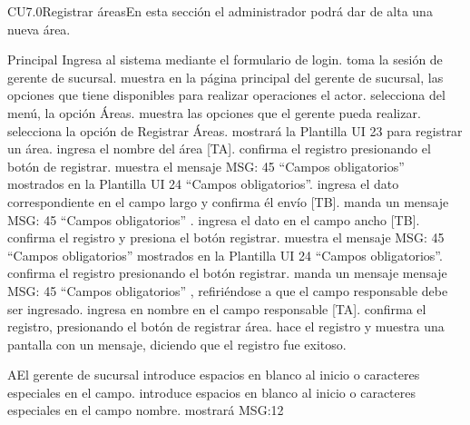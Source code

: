 
	\begin{UseCase}{CU7.0}{Registrar áreas}{En esta sección el administrador podrá dar de alta una nueva área.}
	\end{UseCase}


	\begin{UCtrayectoria}{Principal}
		\UCpaso[\UCactor] Ingresa al sistema mediante el formulario de login.
		\UCpaso toma la sesión de gerente de sucursal.
		\UCpaso muestra en la página principal del gerente de sucursal, las opciones que tiene disponibles para realizar operaciones el actor. 
		\UCpaso[\UCactor] selecciona del menú, la opción Áreas.
		\UCpaso muestra las opciones que el gerente pueda realizar.
		\UCpaso[\UCactor] selecciona la opción de Registrar Áreas.
		\UCpaso mostrará la Plantilla UI 23 para registrar un área.
		\UCpaso[\UCactor] ingresa el nombre del área [TA].
		\UCpaso[\UCactor] confirma el registro presionando el botón de registrar.
		\UCpaso muestra el mensaje MSG: 45 “Campos obligatorios”  mostrados en la Plantilla UI 24 “Campos obligatorios”.
		\UCpaso[\UCactor] ingresa el dato correspondiente en el campo largo y confirma él envío [TB].
		\UCpaso manda un mensaje MSG: 45 “Campos obligatorios” .
		\UCpaso[\UCactor] ingresa el dato en el campo ancho [TB].
		\UCpaso[\UCactor] confirma el registro y presiona el botón registrar.
		\UCpaso muestra el mensaje MSG: 45 “Campos obligatorios”  mostrados en la Plantilla UI 24 “Campos obligatorios”.
		\UCpaso[\UCactor] confirma el registro presionando el botón registrar.
		\UCpaso manda un mensaje mensaje MSG: 45 “Campos obligatorios” , refiriéndose a  que el campo responsable debe ser ingresado.
		\UCpaso[\UCactor] ingresa en nombre en el campo responsable [TA].
		\UCpaso[\UCactor] confirma el registro, presionando el botón de registrar área.
		\UCpaso hace el registro y muestra una pantalla con un mensaje, diciendo que el registro fue exitoso.
	\end{UCtrayectoria}
		
		\begin{UCtrayectoriaA}{A}{El gerente de sucursal introduce espacios en blanco al inicio o caracteres especiales en el campo.}
			\UCpaso[\UCactor] introduce espacios en blanco al inicio o caracteres especiales en el campo nombre.
			\UCpaso mostrará MSG:12 
		\end{UCtrayectoriaA}